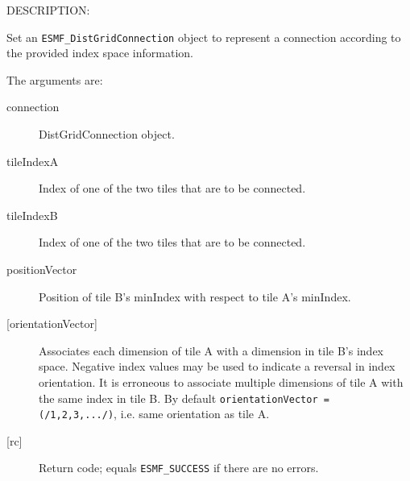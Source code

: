 {\sf DESCRIPTION:\\ }


     \label{api:DistGridConnectionSet}
     Set an {\tt ESMF\_DistGridConnection} object to represent a connection 
     according to the provided index space information.
  
     The arguments are:
     \begin{description}
     \item[connection] 
       DistGridConnection object.
     \item[tileIndexA] 
       Index of one of the two tiles that are to be connected.
     \item[tileIndexB] 
       Index of one of the two tiles that are to be connected.
     \item[positionVector] 
       Position of tile B's minIndex with respect to tile A's minIndex.
     \item[{[orientationVector]}]
       Associates each dimension of tile A with a dimension in tile B's 
       index space. Negative index values may be used to indicate a 
       reversal in index orientation. It is erroneous to associate multiple
       dimensions of tile A with the same index in tile B. By default
       {\tt orientationVector = (/1,2,3,.../)}, i.e. same orientation as tile A.
     \item[{[rc]}] 
       Return code; equals {\tt ESMF\_SUCCESS} if there are no errors.
     \end{description}
  
\setlength{\parskip}{\oldparskip}
\setlength{\parindent}{\oldparindent}
\setlength{\baselineskip}{\oldbaselineskip}
